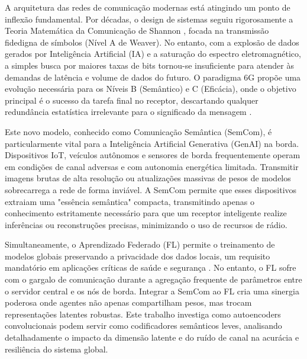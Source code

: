 \documentclass[conference]{IEEEtran}
\begin{document}
A arquitetura das redes de comunicação modernas está atingindo um ponto de inflexão fundamental. Por décadas, o design de sistemas seguiu rigorosamente a Teoria Matemática da Comunicação de Shannon \cite{shannon1948}, focada na transmissão fidedigna de símbolos (Nível A de Weaver). No entanto, com a explosão de dados gerados por Inteligência Artificial (IA) e a saturação do espectro eletromagnético, a simples busca por maiores taxas de bits tornou-se insuficiente para atender às demandas de latência e volume de dados do futuro. O paradigma 6G propõe uma evolução necessária para os Níveis B (Semântico) e C (Eficácia), onde o objetivo principal é o sucesso da tarefa final no receptor, descartando qualquer redundância estatística irrelevante para o significado da mensagem \cite{yang2022semantic}.

Este novo modelo, conhecido como Comunicação Semântica (SemCom), é particularmente vital para a Inteligência Artificial Generativa (GenAI) na borda. Dispositivos IoT, veículos autônomos e sensores de borda frequentemente operam em condições de canal adversas e com autonomia energética limitada. Transmitir imagens brutas de alta resolução ou atualizações massivas de pesos de modelos sobrecarrega a rede de forma inviável. A SemCom permite que esses dispositivos extraiam uma "essência semântica" compacta, transmitindo apenas o conhecimento estritamente necessário para que um receptor inteligente realize inferências ou reconstruções precisas, minimizando o uso de recursos de rádio.

Simultaneamente, o Aprendizado Federado (FL) permite o treinamento de modelos globais preservando a privacidade dos dados locais, um requisito mandatório em aplicações críticas de saúde e segurança \cite{mcmahan2017}. No entanto, o FL sofre com o gargalo de comunicação durante a agregação frequente de parâmetros entre o servidor central e os nós de borda. Integrar a SemCom ao FL cria uma sinergia poderosa onde agentes não apenas compartilham pesos, mas trocam representações latentes robustas. Este trabalho investiga como autoencoders convolucionais podem servir como codificadores semânticos leves, analisando detalhadamente o impacto da dimensão latente e do ruído de canal na acurácia e resiliência do sistema global.
\end{document}
